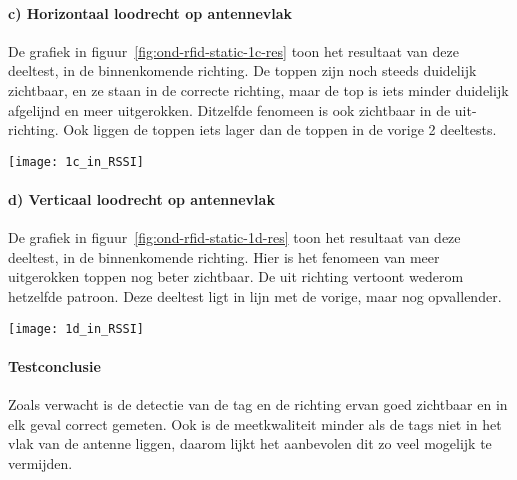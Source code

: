 \paragraph{c) Horizontaal loodrecht op antennevlak}
\begin{minipage}{0.55\textwidth}
De grafiek in figuur~\ref{fig:ond-rfid-static-1c-res} toon het resultaat van deze deeltest, in de binnenkomende richting. De toppen zijn noch steeds duidelijk zichtbaar, en ze staan in de correcte richting, maar de top is iets minder duidelijk afgelijnd en meer uitgerokken. Ditzelfde fenomeen is ook zichtbaar in de uit-richting. Ook liggen de toppen iets lager dan de toppen in de vorige 2 deeltests.
\end{minipage}
\hfill
\begin{minipage}{0.42\textwidth}
	\texttt{[image: 1c\_in\_RSSI]}
	\label{fig:ond-rfid-static-1c-res}
\end{minipage}

\paragraph{d) Verticaal loodrecht op antennevlak}
\begin{minipage}{0.55\textwidth}
De grafiek in figuur~\ref{fig:ond-rfid-static-1d-res} toon het resultaat van deze deeltest, in de binnenkomende richting. Hier is het fenomeen van meer uitgerokken toppen nog beter zichtbaar. De uit richting vertoont wederom hetzelfde patroon. Deze deeltest ligt in lijn met de vorige, maar nog opvallender.
\end{minipage}
\hfill
\begin{minipage}{0.42\textwidth}
	\texttt{[image: 1d\_in\_RSSI]}
	\label{fig:ond-rfid-static-1d-res}
\end{minipage}

\paragraph{Testconclusie}
Zoals verwacht is de detectie van de tag en de richting ervan goed zichtbaar en in elk geval correct gemeten. Ook is de meetkwaliteit minder als de tags niet in het vlak van de antenne liggen, daarom lijkt het aanbevolen dit zo veel mogelijk te vermijden.

